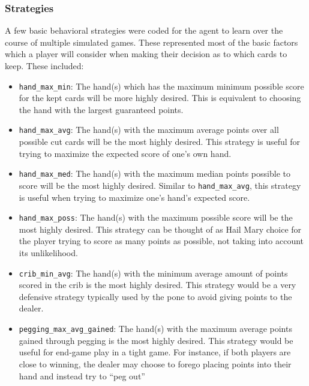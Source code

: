 
\subsubsection{Strategies}


A few basic behavioral strategies were coded for the agent to learn
over the course of multiple simulated games.
%
These represented most of the basic factors which a player will consider when
making their decision as to which cards to keep.
%
These included:
\begin{itemize}
\item \texttt{hand\_max\_min}:
	The hand(s) which has the maximum minimum possible score for the kept cards
	will be more highly desired.
	This is equivalent to choosing the hand with the largest guaranteed points.
\item \texttt{hand\_max\_avg}:
	The hand(s) with the maximum average points over all possible cut cards will
	be the most highly desired.
	This strategy is useful for trying to maximize the expected score of one's
	own hand.
\item \texttt{hand\_max\_med}:
	The hand(s) with the maximum median points possible to score will be the most
	highly desired.
	Similar to \texttt{hand\_max\_avg}, this strategy is useful when trying to
	maximize one's hand's expected score.
\item \texttt{hand\_max\_poss}:
	The hand(s) with the maximum possible score will be the most highly desired.
	This strategy can be thought of as Hail Mary choice for the player trying to
	score as many points as possible, not taking into account its unlikelihood.
\item \texttt{crib\_min\_avg}:
	The hand(s) with the minimum average amount of points scored in the crib is
	the most highly desired.
	This strategy would be a very defensive strategy typically used by the pone
	to avoid giving points to the dealer.
\item \texttt{pegging\_max\_avg\_gained}:
	The hand(s) with the maximum average points gained through pegging is the most
	highly desired.
	This strategy would be useful for end-game play in a tight game.
	For instance, if both players are close to winning, the dealer may
	choose to forego placing points into their hand and instead try to
		``peg out''

\end{itemize}
